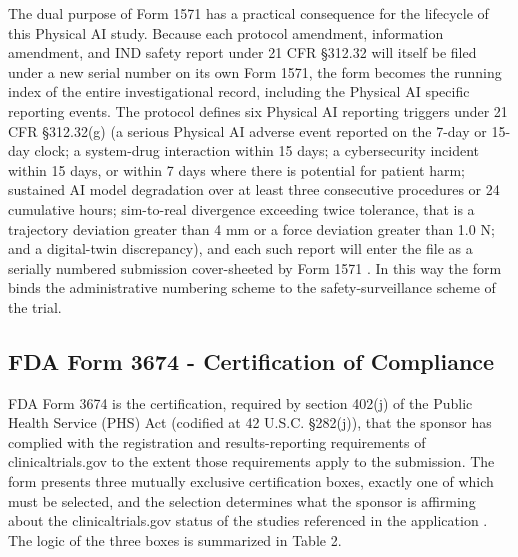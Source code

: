 The dual purpose of Form 1571 has a practical consequence for the
lifecycle of this Physical AI study. Because each protocol amendment,
information amendment, and IND safety report under 21 CFR \S 312.32 will
itself be filed under a new serial number on its own Form 1571, the form
becomes the running index of the entire investigational record, including
the Physical AI specific reporting events. The protocol defines six
Physical AI reporting triggers under 21 CFR \S 312.32(g) (a serious
Physical AI adverse event reported on the 7-day or 15-day clock; a
system-drug interaction within 15 days; a cybersecurity incident within 15
days, or within 7 days where there is potential for patient harm;
sustained AI model degradation over at least three consecutive procedures
or 24 cumulative hours; sim-to-real divergence exceeding twice tolerance,
that is a trajectory deviation greater than 4 mm or a force deviation
greater than 1.0 N; and a digital-twin discrepancy), and each such report
will enter the file as a serially numbered submission cover-sheeted by
Form 1571 \cite{paiautospons, congress9510}. In this way the form binds
the administrative numbering scheme to the safety-surveillance scheme of
the trial.

\subsection{FDA Form 3674 - Certification of Compliance}

FDA Form 3674 is the certification, required by section 402(j) of the
Public Health Service (PHS) Act (codified at 42 U.S.C. \S 282(j)), that
the sponsor has complied with the registration and results-reporting
requirements of clinicaltrials.gov to the extent those requirements apply
to the submission. The form presents three mutually exclusive
certification boxes, exactly one of which must be selected, and the
selection determines what the sponsor is affirming about the
clinicaltrials.gov status of the studies referenced in the application
\cite{phase1guidance}. The logic of the three boxes is summarized in
Table 2.

